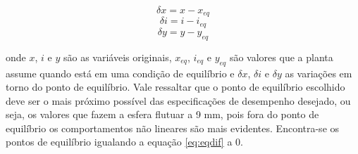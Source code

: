 \documentclass{ifacconf}
\begin{document}
\begin{equation}
    \delta x = x - x_{eq}
\end{equation}
\begin{equation}
    \delta i = i - i_{eq}
\end{equation}
\begin{equation}
    \delta y = y - y_{eq}
\end{equation}

\noindent onde $x$, $i$ e $y$ são as variáveis originais, $x_{eq}$, $i_{eq}$ e $y_{eq}$ são valores que a planta assume quando está em uma condição de equilíbrio e $\delta x$, $\delta i$ e $\delta y$ as variações em torno do ponto de equilíbrio. Vale ressaltar que o ponto de equilíbrio escolhido deve ser o mais próximo possível das especificações de desempenho desejado, ou seja, os valores que fazem a esfera flutuar a 9 mm, pois fora do ponto de equilíbrio os comportamentos não lineares são mais evidentes. Encontra-se os pontos de equilíbrio igualando a equação \ref{eq:eqdif} a 0.
\end{document}
